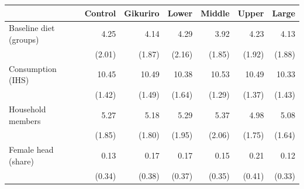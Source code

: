 \begin{tabular}{lrrrrrr}
\toprule
 & Control & Gikuriro & Lower & Middle & Upper & Large \\
\midrule
Baseline diet (groups) & 4.25 & 4.14 & 4.29 & 3.92 & 4.23 & 4.13 \\
 & (2.01) & (1.87) & (2.16) & (1.85) & (1.92) & (1.88) \\
Consumption (IHS) & 10.45 & 10.49 & 10.38 & 10.53 & 10.49 & 10.33 \\
 & (1.42) & (1.49) & (1.64) & (1.29) & (1.37) & (1.43) \\
Household members & 5.27 & 5.18 & 5.29 & 5.37 & 4.98 & 5.08 \\
 & (1.85) & (1.80) & (1.95) & (2.06) & (1.75) & (1.64) \\
Female head (share) & 0.13 & 0.17 & 0.17 & 0.15 & 0.21 & 0.12 \\
 & (0.34) & (0.38) & (0.37) & (0.35) & (0.41) & (0.33) \\
\bottomrule
\end{tabular}
